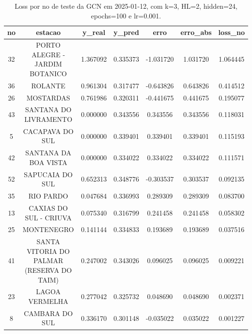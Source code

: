 \begin{table}[h]
\centering
\caption{Loss por no de teste da GCN em 2025-01-12, com k=3, HL=2, hidden=24, epochs=100 e lr=0.001.}
\label{tab:gcn_loss_k3_hl2_h24_e100_d20250112}
\begin{tabular}{ccccccc}
\toprule
no & estacao & y\_real & y\_pred & erro & erro\_abs & loss\_no \\
\midrule
32 & PORTO ALEGRE - JARDIM BOTANICO & 1.367092 & 0.335373 & -1.031720 & 1.031720 & 1.064445 \\
36 & ROLANTE & 0.961304 & 0.317477 & -0.643826 & 0.643826 & 0.414512 \\
26 & MOSTARDAS & 0.761986 & 0.320311 & -0.441675 & 0.441675 & 0.195077 \\
43 & SANTANA DO LIVRAMENTO & 0.000000 & 0.343556 & 0.343556 & 0.343556 & 0.118031 \\
5 & CACAPAVA DO SUL & 0.000000 & 0.339401 & 0.339401 & 0.339401 & 0.115193 \\
42 & SANTANA DA BOA VISTA & 0.000000 & 0.334022 & 0.334022 & 0.334022 & 0.111571 \\
52 & SAPUCAIA DO SUL & 0.652313 & 0.348776 & -0.303537 & 0.303537 & 0.092135 \\
35 & RIO PARDO & 0.047684 & 0.336993 & 0.289309 & 0.289309 & 0.083700 \\
13 & CAXIAS DO SUL - CRIUVA & 0.075340 & 0.316799 & 0.241458 & 0.241458 & 0.058302 \\
25 & MONTENEGRO & 0.141144 & 0.334833 & 0.193689 & 0.193689 & 0.037516 \\
41 & SANTA VITORIA DO PALMAR (RESERVA DO TAIM) & 0.247002 & 0.343026 & 0.096025 & 0.096025 & 0.009221 \\
23 & LAGOA VERMELHA & 0.277042 & 0.325732 & 0.048690 & 0.048690 & 0.002371 \\
8 & CAMBARA DO SUL & 0.336170 & 0.301148 & -0.035022 & 0.035022 & 0.001227 \\
\bottomrule
\end{tabular}
\end{table}
